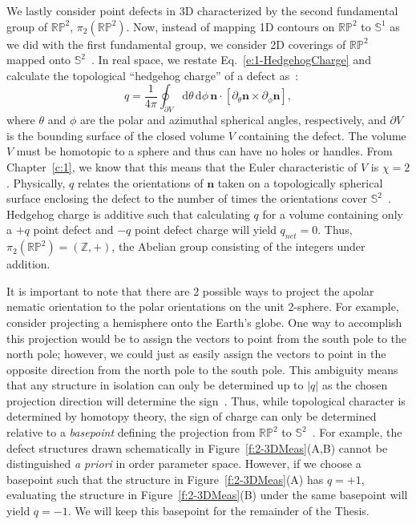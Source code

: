 We lastly consider point defects in 3D characterized by the second fundamental group of $\mathbb{R}\mathbb{P}^2$, $\pi_{2}(\mathbb{R}\mathbb{P}^2)$.
Now, instead of mapping 1D contours on $\mathbb{R}\mathbb{P}^2$ to $\mathbb{S}^1$ as we did with the first fundamental group, we consider 2D coverings of $\mathbb{R}\mathbb{P}^2$ mapped onto $\mathbb{S}^2$~\cite{RN196,RN153,RN236}.
In real space, we restate Eq.~\ref{e:1-HedgehogCharge} and calculate the topological ``hedgehog charge'' of a defect as~\cite{RN153}:
\begin{equation}
  q = \frac{1}{4 \pi} \oint_{\partial V} \textrm{d} \theta \, \textrm{d} \phi \, \mathbf{n} \cdot \left [ \partial_{\theta} \mathbf{n} \times \partial_{\phi} \mathbf{n} \right ],\label{e:2-hedCharge}
\end{equation}
 where $\theta$ and $\phi$ are the polar and azimuthal spherical angles, respectively, and $\partial V$ is the bounding surface of the closed volume $V$ containing the defect.
The volume $V$ must be homotopic to a sphere and thus can have no holes or handles.
From Chapter~\ref{c:1}, we know that this means that the Euler characteristic of $V$ is $\chi = 2$.
Physically, $q$ relates the orientations of $\mathbf{n}$ taken on a topologically spherical surface enclosing the defect to the number of times the orientations cover $\mathbb{S}^2$~\cite{RN153}.
Hedgehog charge is additive such that calculating $q$ for a volume containing only a $+q$ point defect and $-q$ point defect charge will yield $q_{net} = 0$.
Thus, $\pi_{2}(\mathbb{R}\mathbb{P}^2) = (\mathbb{Z}, +)$, the Abelian group consisting of the integers under addition.

It is important to note that there are 2 possible ways to project the apolar nematic orientation to the polar orientations on the unit 2-sphere.
For example, consider projecting a hemisphere onto the Earth's globe.
One way to accomplish this projection would be to assign the vectors to point from the south pole to the north pole; however, we could just as easily assign the vectors to point in the opposite direction from the north pole to the south pole.
This ambiguity means that any structure in isolation can only be determined up to $|q|$ as the chosen projection direction will determine the sign~\cite{RN153}.
Thus, while topological character is determined by homotopy theory, the sign of charge can only be determined relative to a \emph{basepoint} defining the projection from $\mathbb{R}\mathbb{P}^2$ to $\mathbb{S}^2$~\cite{RN153}.
For example, the defect structures drawn schematically in Figure~\ref{f:2-3DMeas}(A,B) cannot be distinguished \emph{a priori} in order parameter space.
However, if we choose a basepoint such that the structure in Figure~\ref{f:2-3DMeas}(A) has $q = +1$, evaluating the structure in Figure~\ref{f:2-3DMeas}(B) under the same basepoint will yield $q = -1$.
We will keep this basepoint for the remainder of the Thesis.\\

